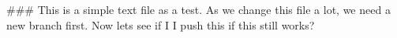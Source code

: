 ###
This is a simple text file as a test.
As we change this file a lot, we need a new branch first.
Now lets see if I I push this if this still works?
